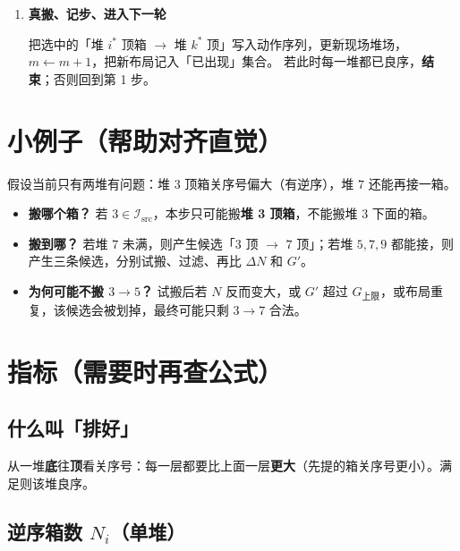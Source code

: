 \documentclass[11pt,a4paper]{ctexart}
\newcommand{\capG}{G_{\mathrm{上限}}}
\begin{document}
\begin{enumerate}[label=\textbf{第 \arabic* 步}, leftmargin=2.2em]
  \textbf{排序规则（从上到下比，先比赢的优先）：}
  \[
    \sum_\tau N_\tau \ \text{小}
    \ \rightarrow\
    N' \ \text{小}
    \ \rightarrow\
    m+1 \ \text{小}
    \ \rightarrow\
    B \ \text{大}.
  \]
  取排在最前面的一档；若这一档还有多条，\textbf{随机抽一条}执行。

  \item \textbf{真搬、记步、进入下一轮}

  把选中的「堆 $i^\ast$ 顶箱 $\to$ 堆 $k^\ast$ 顶」写入动作序列，更新现场堆场，$m\leftarrow m+1$，把新布局记入「已出现」集合。
  若此时每一堆都已良序，\textbf{结束}；否则回到第 1 步。

\end{enumerate}

\section{小例子（帮助对齐直觉）}

假设当前只有两堆有问题：堆 $3$ 顶箱关序号偏大（有逆序），堆 $7$ 还能再接一箱。
\begin{itemize}
  \item \textbf{搬哪个箱？} 若 $3\in\mathcal{I}_{\mathrm{src}}$，本步只可能搬\textbf{堆 3 顶箱}，不能搬堆 3 下面的箱。
  \item \textbf{搬到哪？} 若堆 $7$ 未满，则产生候选「$3$ 顶 $\to$ $7$ 顶」；若堆 $5,7,9$ 都能接，则产生三条候选，分别试搬、过滤、再比 $\Delta N$ 和 $G'$。
  \item \textbf{为何可能不搬 $3\to 5$？} 试搬后若 $N$ 反而变大，或 $G'$ 超过 $\capG$，或布局重复，该候选会被划掉，最终可能只剩 $3\to 7$ 合法。
\end{itemize}

\section{指标（需要时再查公式）}

\subsection{什么叫「排好」}

从一堆\textbf{底}往\textbf{顶}看关序号：每一层都要比上面一层\textbf{更大}（先提的箱关序号更小）。满足则该堆良序。

\subsection{逆序箱数 $N_i$（单堆）}
\end{document}
